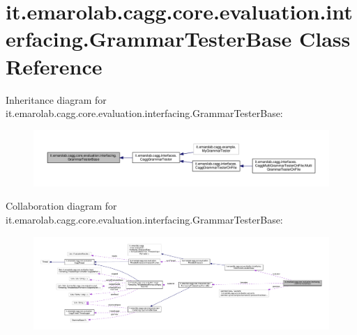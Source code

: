 \hypertarget{classit_1_1emarolab_1_1cagg_1_1core_1_1evaluation_1_1interfacing_1_1GrammarTesterBase}{\section{it.\-emarolab.\-cagg.\-core.\-evaluation.\-interfacing.\-Grammar\-Tester\-Base Class Reference}
\label{classit_1_1emarolab_1_1cagg_1_1core_1_1evaluation_1_1interfacing_1_1GrammarTesterBase}
}


Inheritance diagram for it.\-emarolab.\-cagg.\-core.\-evaluation.\-interfacing.\-Grammar\-Tester\-Base\-:\nopagebreak
\begin{figure}[H]
\begin{center}
\leavevmode
\includegraphics[width=350pt]{classit_1_1emarolab_1_1cagg_1_1core_1_1evaluation_1_1interfacing_1_1GrammarTesterBase__inherit__graph}
\end{center}
\end{figure}


Collaboration diagram for it.\-emarolab.\-cagg.\-core.\-evaluation.\-interfacing.\-Grammar\-Tester\-Base\-:\nopagebreak
\begin{figure}[H]
\begin{center}
\leavevmode
\includegraphics[width=350pt]{classit_1_1emarolab_1_1cagg_1_1core_1_1evaluation_1_1interfacing_1_1GrammarTesterBase__coll__graph}
\end{center}
\end{figure}

